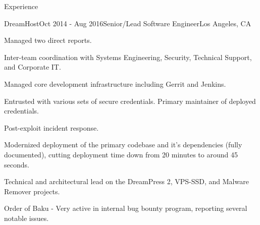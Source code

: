 \documentclass{resume} %
\begin{document}
\begin{rSection}{Experience}

\begin{rSubsection}{DreamHost}{Oct 2014 - Aug 2016}{Senior/Lead Software Engineer}{Los Angeles, CA}
\item Managed two direct reports.
\item Inter-team coordination with Systems Engineering, Security, Technical Support, and Corporate IT.
\item Managed core development infrastructure including Gerrit and Jenkins.
\item Entrusted with various sets of secure credentials. Primary maintainer of deployed credentials.
\item Post-exploit incident response.
\item Modernized deployment of the primary codebase and it's dependencies (fully documented), cutting deployment time down from 20 minutes to around 45 seconds.
\item Technical and architectural lead on the DreamPress 2, VPS-SSD, and Malware Remover projects.
\item Order of Baku - Very active in internal bug bounty program, reporting several notable issues.
\end{rSubsection}



\end{rSection}
\end{document}
